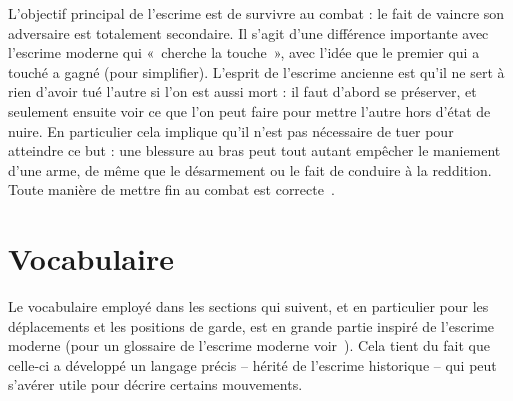 L'objectif principal de l'escrime est de survivre au combat : le fait de vaincre son adversaire est totalement secondaire.
Il s'agit d'une différence importante avec l'escrime moderne qui « cherche la touche », avec l'idée que le premier qui a touché a gagné (pour simplifier).
L'esprit de l'escrime ancienne est qu'il ne sert à rien d'avoir tué l'autre si l'on est aussi mort : il faut d'abord se préserver, et seulement ensuite voir ce que l'on peut faire pour mettre l'autre hors d'état de nuire.
En particulier cela implique qu'il n'est pas nécessaire de tuer pour atteindre ce but : une blessure au bras peut tout autant empêcher le maniement d'une arme, de même que le désarmement ou le fait de conduire à la reddition.
Toute manière de mettre fin au combat est correcte~\footnotemark{}.


\section{Vocabulaire}


Le vocabulaire employé dans les sections qui suivent, et en particulier pour les déplacements et les positions de garde, est en grande partie inspiré de l'escrime moderne (pour un glossaire de l'escrime moderne voir~\cite{FIE:2014:BrefsGlossairesLescrime}).
Cela tient du fait que celle-ci a développé un langage précis -- hérité de l'escrime historique -- qui peut s'avérer utile pour décrire certains mouvements.
